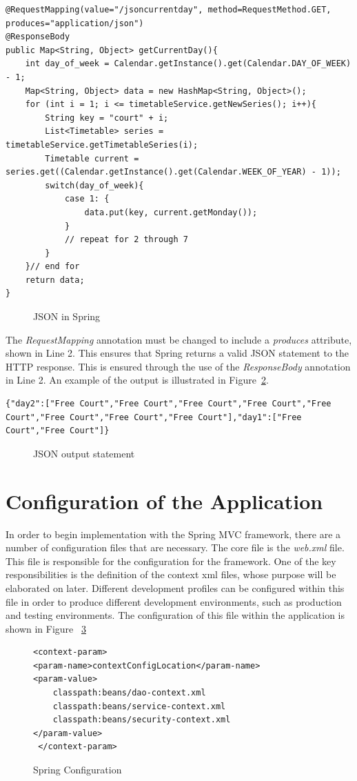 \begin{lstlisting}
@RequestMapping(value="/jsoncurrentday", method=RequestMethod.GET, produces="application/json")
@ResponseBody
public Map<String, Object> getCurrentDay(){
	int day_of_week = Calendar.getInstance().get(Calendar.DAY_OF_WEEK) - 1;
	Map<String, Object> data = new HashMap<String, Object>();
	for (int i = 1; i <= timetableService.getNewSeries(); i++){
		String key = "court" + i;
		List<Timetable> series = timetableService.getTimetableSeries(i);
		Timetable current = series.get((Calendar.getInstance().get(Calendar.WEEK_OF_YEAR) - 1));
		switch(day_of_week){
			case 1: {
				data.put(key, current.getMonday());
			}
			// repeat for 2 through 7
		}
	}// end for
	return data;
}
\end{lstlisting}
\begin{figure}[H]
\caption{JSON in Spring}
\label{fig:json}
\end{figure}

The \textit{RequestMapping} annotation must be changed to include a \textit{produces} attribute, shown in Line 2. This ensures that Spring returns a valid JSON statement to the HTTP response. This is ensured through the use of the \textit{ResponseBody} annotation in Line 2.  An example of the output is illustrated in Figure~\ref{fig:jsonex}.

\begin{lstlisting}
{"day2":["Free Court","Free Court","Free Court","Free Court","Free Court","Free Court","Free Court","Free Court"],"day1":["Free Court","Free Court"]}
\end{lstlisting}
\begin{figure}
\caption{JSON output statement}
\label{fig:jsonex}
\end{figure}



\section{Configuration of the Application}

In order to begin implementation with the Spring MVC framework, there are a number of configuration files that are necessary. The core file is the \textit{web.xml} file. This file is responsible for the configuration for the framework. One of the key responsibilities is the definition of the context xml files, whose purpose will be elaborated on later. Different development profiles can be configured within this file in order to produce different development environments, such as production and testing environments. The configuration of this file within the application is shown in Figure ~\ref{fig:springConfig} \newline 
\begin{figure}[H]
\begin{lstlisting}
<context-param>
<param-name>contextConfigLocation</param-name>
<param-value>
	classpath:beans/dao-context.xml
	classpath:beans/service-context.xml
	classpath:beans/security-context.xml
</param-value>
 </context-param>
\end{lstlisting}
\caption{Spring Configuration}
\label{fig:springConfig}
\end{figure}

